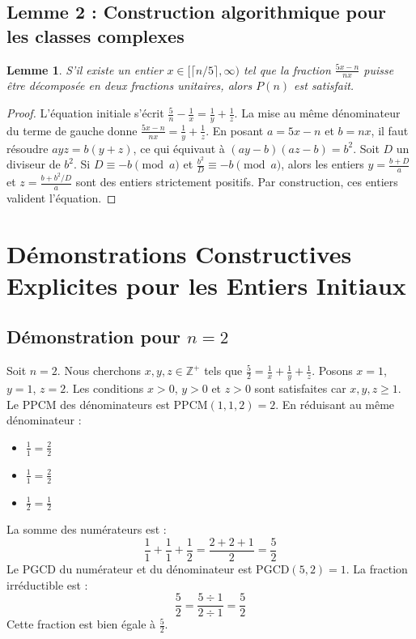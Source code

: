 \documentclass[11pt,a4paper]{article}
\newtheorem{lemma}{Lemme}
\begin{document}
\subsection{Lemme 2 : Construction algorithmique pour les classes complexes}

\begin{lemma}
S'il existe un entier $x \in [\lceil n/5 \rceil, \infty)$ tel que la fraction $\frac{5x-n}{nx}$ puisse être décomposée en deux fractions unitaires, alors $P(n)$ est satisfait.
\end{lemma}

\begin{proof}
L'équation initiale s'écrit $\frac{5}{n} - \frac{1}{x} = \frac{1}{y} + \frac{1}{z}$.
La mise au même dénominateur du terme de gauche donne $\frac{5x-n}{nx} = \frac{1}{y} + \frac{1}{z}$.
En posant $a = 5x-n$ et $b = nx$, il faut résoudre $a y z = b(y + z)$, ce qui équivaut à $(ay-b)(az-b) = b^2$.
Soit $D$ un diviseur de $b^2$. Si $D \equiv -b \pmod a$ et $\frac{b^2}{D} \equiv -b \pmod a$, alors les entiers $y = \frac{b+D}{a}$ et $z = \frac{b + b^2/D}{a}$ sont des entiers strictement positifs. Par construction, ces entiers valident l'équation.
\end{proof}

\section{Démonstrations Constructives Explicites pour les Entiers Initiaux}

\subsection{Démonstration pour $n = 2$}
Soit $n = 2$. Nous cherchons $x, y, z \in \mathbb{Z}^{+}$ tels que $\frac{5}{2} = \frac{1}{x} + \frac{1}{y} + \frac{1}{z}$.
Posons $x = 1$, $y = 1$, $z = 2$.
Les conditions $x > 0$, $y > 0$ et $z > 0$ sont satisfaites car $x, y, z \geq 1$.
Le PPCM des dénominateurs est $\text{PPCM}(1, 1, 2) = 2$.
En réduisant au même dénominateur :
\begin{itemize}
    \item $\frac{1}{1} = \frac{2}{2}$
    \item $\frac{1}{1} = \frac{2}{2}$
    \item $\frac{1}{2} = \frac{1}{2}$
\end{itemize}
La somme des numérateurs est :
$$ \frac{1}{1} + \frac{1}{1} + \frac{1}{2} = \frac{2 + 2 + 1}{2} = \frac{5}{2} $$
Le PGCD du numérateur et du dénominateur est $\text{PGCD}(5, 2) = 1$.
La fraction irréductible est :
$$ \frac{5}{2} = \frac{5 \div 1}{2 \div 1} = \frac{5}{2} $$
Cette fraction est bien égale à $\frac{5}{2}$.
\end{document}
